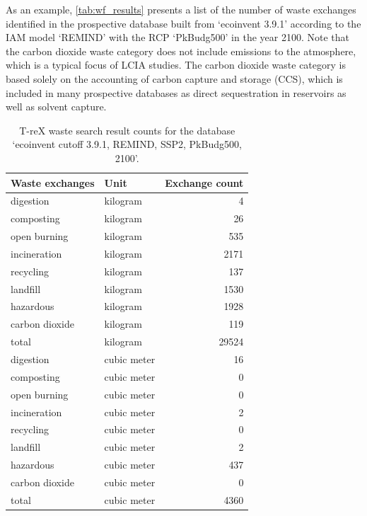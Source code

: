 \documentclass{article}
\begin{document}
As an example, \autoref{tab:wf_results} presents a list of the number of waste exchanges identified in the prospective database built from `ecoinvent 3.9.1' according to the IAM model `REMIND' with the RCP `PkBudg500' in the year 2100. Note that the carbon dioxide waste category does not include emissions to the atmosphere, which is a typical focus of LCIA studies. The carbon dioxide waste category is based solely on the accounting of carbon capture and storage (CCS), which is included in many prospective databases as direct sequestration in reservoirs as well as solvent capture.

\begin{table}[ht]
    \centering
    \caption{T-reX waste search result counts for the database `ecoinvent cutoff 3.9.1, REMIND, SSP2, PkBudg500, 2100'.}\label{tab:wf_results}
    \begin{tabular}{llr}
        \toprule
        \textbf{Waste exchanges} & \textbf{Unit} & \textbf{Exchange count} \\
        \midrule
        digestion & kilogram & 4 \\
        composting & kilogram & 26 \\
        open burning & kilogram & 535 \\
        incineration & kilogram & 2171 \\
        recycling & kilogram & 137 \\
        landfill & kilogram & 1530 \\
        hazardous & kilogram & 1928 \\
        carbon dioxide & kilogram & 119 \\
        total & kilogram & 29524 \\
        digestion & cubic meter & 16 \\
        composting & cubic meter & 0 \\
        open burning & cubic meter & 0 \\
        incineration & cubic meter & 2 \\
        recycling & cubic meter & 0 \\
        landfill & cubic meter & 2 \\
        hazardous & cubic meter & 437 \\
        carbon dioxide & cubic meter & 0 \\
        total & cubic meter & 4360 \\
        \bottomrule
\end{tabular}
\end{table}
\end{document}
